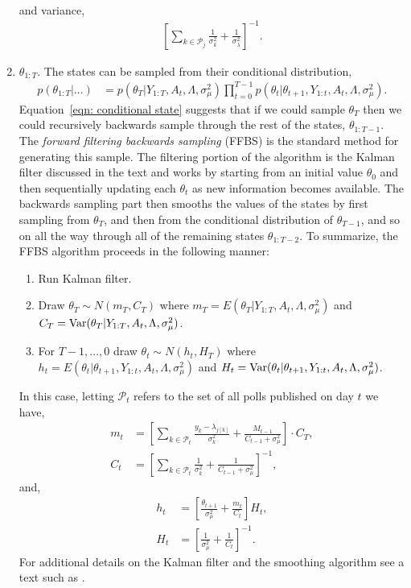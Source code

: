 \documentclass[12pt,final,fleqn]{article}
\theoremstyle{plain}
\newcommand\var{{\rm Var}}
\begin{document}
\begin{appendices}
\begin{enumerate}
\begin{align}
\end{align}
and variance,
\begin{align}
\left[\sum_{k \in \mathcal{P}_j} \frac{1}{\sigma^2_k} + \frac{1}{\sigma^2_\lambda}\right]^{-1}.
\end{align}
\item $\theta_{1:T}$. The states can be sampled from their conditional distribution,
\begin{align}
\label{eqn: conditional state}
p(\theta_{1:T}|\ldots)&= p(\theta_T| Y_{1:T}, A_t, \Lambda, \sigma^2_\mu) \prod_{t=0}^{T-1} p(\theta_t|\theta_{t+1}, Y_{1:t}, A_t, \Lambda, \sigma^2_\mu).
\end{align}
Equation~\ref{eqn: conditional state} suggests that if we could sample $\theta_T$ then we could recursively backwards sample through the rest of the states, $\theta_{1:T-1}$. The \emph{forward filtering backwards sampling} (FFBS) is the standard method for generating this sample. The filtering portion of the algorithm is the Kalman filter discussed in the text and works by starting from an initial value $\theta_0$ and then sequentially updating each $\theta_t$ as new information becomes available. The backwards sampling part then smooths the values of the states by first sampling from $\theta_T$, and then from the conditional distribution of $\theta_{T-1}$, and so on all the way through all of the remaining states $\theta_{1:T-2}$. To summarize, the FFBS algorithm proceeds in the following manner: 
\begin{enumerate}
\item Run Kalman filter.
\item Draw $\theta_T \sim N(m_T, C_T)$ where $m_T = E(\theta_T|Y_{1:T}, A_t, \Lambda, \sigma^2_\mu)$ and $C_T = \var(\theta_T | Y_{1:T}, A_t, \Lambda, \sigma^2_\mu)$.
\item For $T-1, \ldots, 0$ draw $\theta_t \sim N(h_t, H_T)$ where $h_t = E(\theta_t|\theta_{t+1}, Y_{1:t}, A_t, \Lambda, \sigma^2_\mu)$ and $H_t = \var(\theta_t|\theta_{t+1}, Y_{1:t}, A_t, \Lambda, \sigma^2_\mu)$.
\end{enumerate}
In this case, letting $\mathcal{P}_t$ refers to the set of all polls published on day $t$ we have,
\begin{align}
m_t &= \left[\sum_{k \in \mathcal{P}_t} \frac{y_k - \lambda_{j[k]}}{\sigma^2_k} + \frac{M_{t-1}}{C_{t-1} + \sigma^2_\mu}\right]\cdot C_T,\\
C_t &= \left[\sum_{k \in \mathcal{P}_t} \frac{1}{\sigma^2_k} + \frac{1}{C_{t-1} + \sigma^2_\mu} \right]^{-1},
\end{align}
and,
\begin{align}
h_t &= \left[\frac{\theta_{t+1}}{\sigma^2_\mu}+ \frac{m_t}{C_t}\right]H_t, \\
H_t &= \left[\frac{1}{\sigma^2_\mu} + \frac{1}{C_t}\right]^{-1}.
\end{align}
For additional details on the Kalman filter and the smoothing algorithm see a text such as \citet{west1997bayesian}.
\end{enumerate}


\end{appendices}
\end{document}
